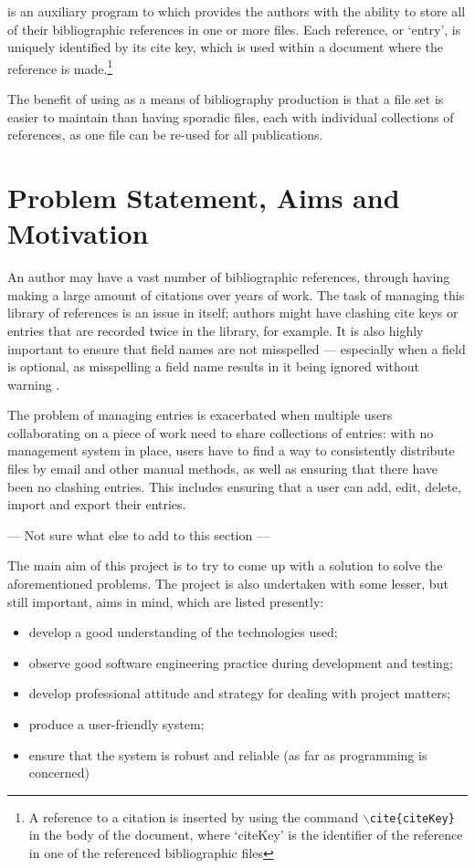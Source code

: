 \bibtex{} is an auxiliary program to \latex which provides the authors with the ability to store all of their bibliographic references in one or more files.  Each reference, or `entry', is uniquely identified by its cite key, which is used within a document where the reference is made.\footnote{A reference to a citation is inserted by using the \latex command \texttt{$\backslash$cite\{citeKey\}} in the body of the document, where `citeKey' is the identifier of the reference in one of the referenced bibliographic files}

The benefit of using \bibtex{} as a means of bibliography production is that a file set is easier to maintain than having sporadic files, each with individual collections of references, as one file can be re-used for all publications.

\section{Problem Statement, Aims and Motivation}
An author may have a vast number of bibliographic references, through having making a large amount of citations over years of work.  The task of managing this library of references is an issue in itself; authors might have clashing cite keys or entries that are recorded twice in the library, for example.  It is also highly important to ensure that field names are not misspelled --- especially when a field is optional, as misspelling a field name results in it being ignored without warning \cite{OP88}.

The problem of managing entries is exacerbated when multiple users collaborating on a piece of work need to share collections of entries: with no management system in place, users have to find a way to consistently distribute files by email and other manual methods, as well as ensuring that there have been no clashing entries.  This includes ensuring that a user can add, edit, delete, import and export their entries.

\revisit --- Not sure what else to add to this section --- \revisit

The main aim of this project is to try to come up with a solution to solve the aforementioned problems.  The project is also undertaken with some lesser, but still important, aims in mind, which are listed presently:
\begin{itemize}
\item develop a good understanding of the technologies used;
\item observe good software engineering practice during development and testing;
\item develop professional attitude and strategy for dealing with project matters;
\item produce a user-friendly system;
\item ensure that the system is robust and reliable (as far as programming is concerned)
\end{itemize}

